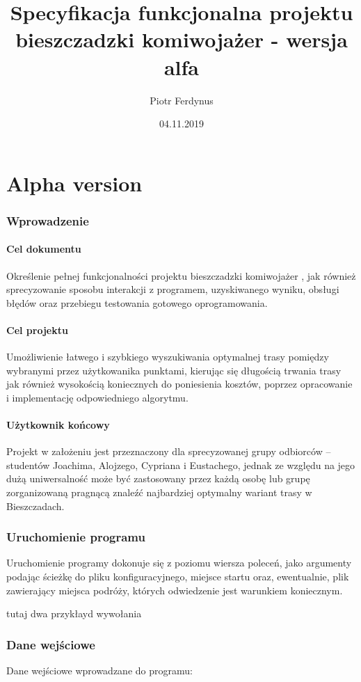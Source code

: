 \documentclass{article}
\title{Specyfikacja funkcjonalna projektu bieszczadzki komiwojażer  - wersja alfa}
\author{Piotr Ferdynus}
\date{04.11.2019}
\begin{document}
\maketitle

\part{Alpha version}
\section{Wprowadzenie}
\subsection{Cel dokumentu}
Określenie pełnej funkcjonalności projektu bieszczadzki komiwojażer , jak również sprecyzowanie sposobu interakcji z programem, uzyskiwanego wyniku, obsługi błędów oraz przebiegu testowania gotowego oprogramowania.
\subsection{Cel projektu}
Umożliwienie łatwego i szybkiego wyszukiwania optymalnej trasy pomiędzy wybranymi przez użytkowanika punktami, kierując się długością trwania trasy jak również wysokością koniecznych do poniesienia kosztów, poprzez opracowanie i implementację odpowiedniego algorytmu.
\subsection{Użytkownik końcowy}
Projekt w założeniu jest przeznaczony dla sprecyzowanej grupy odbiorców -- studentów Joachima, Alojzego, Cypriana i Eustachego, jednak ze względu na jego dużą uniwersalność może być zastosowany przez każdą osobę lub grupę zorganizowaną pragnącą znaleźć najbardziej optymalny wariant trasy w Bieszczadach.
\section{Uruchomienie programu}
Uruchomienie programy dokonuje się z poziomu wiersza poleceń, jako argumenty podając ścieżkę do pliku konfiguracyjnego, miejsce startu oraz, ewentualnie, plik zawierający miejsca podróży, których odwiedzenie jest warunkiem koniecznym.

tutaj dwa przykłayd wywołania

\section{Dane wejściowe}
Dane wejściowe wprowadzane do programu:
\end{document}
